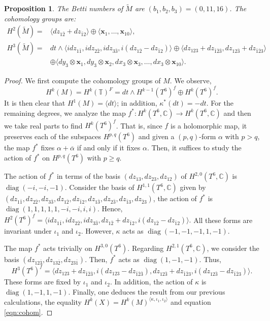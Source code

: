 \documentclass[10pt]{article}
\newcommand{\C}{\mathbb C}
\newcommand{\la}{\langle}
\newcommand{\ra}{\rangle}
\newcommand{\diag}{\operatorname{diag}}
\newcommand{\CC}{\mathbb{C}}
\theoremstyle{plain}
\newtheorem{proposition}{Proposition}
\theoremstyle{definition}
\theoremstyle{remark}
\begin{document}
\begin{proposition} \label{prop:cohomology-M}
The Betti numbers of  $\widetilde{M}$ are $(b_1,b_2,b_3)=(0,11,16)$.
The cohomology groups are:
\begin{align*}
H^2(\widetilde{M})=& \la dz_{1\bar{2}}+ dz_{\bar{1}2} \ra \oplus \la \mathbf{x}_1, \dots, \mathbf{x}_{10} \ra , \\
H^3(\widetilde{M})=&
dt\wedge \la idz_{1\bar{1}},i dz_{2\bar{2}}, i dz_{3\bar{3}}, i(dz_{1\bar{2}}- dz_{\bar{1}2}) \ra \oplus \la dz_{123}+ dz_{\bar{1}\bar{2}\bar{3}},  dz_{12\bar{3}}+ dz_{\bar{1}\bar{2}3} \ra \\
&\oplus \la dy_3 \otimes \mathbf{x}_1, dy_3 \otimes \mathbf{x}_2, dx_3 \otimes \mathbf{x}_3, \dots, dx_3 \otimes \mathbf{x}_{10} \ra.
\end{align*}
\end{proposition}
\begin{proof}
We first compute the cohomology groups of $M$. We observe,
$$
H^k(M)=H^k(\mathbb{T})^{F}=dt\wedge H^{k-1}(T^6)^f \oplus H^k(T^6)^f.
$$
It is then clear that $H^1(M)=\la dt \ra$; in addition, $\kappa^*(dt)=-dt$.
For the remaining degrees, we
analyze the map $f^* \colon H^k(T^6, \CC) \to H^k(T^6, \CC) $ and then we take real parts to find $H^k(T^6)^f$. That is, since $f$ is a holomorphic map, it preserves each of the subspaces $H^{p,q}(T^6)$ and given a $(p,q)$-form $\alpha$ with $p>q$, the map $f^*$ fixes 
$\alpha + \overline{\alpha}$  if and only if it fixes $\alpha$. Then, it suffices to study the action of $f^*$ on $H^{p,q}(T^6)$ with $p\geq q$.

The action of $f^*$ in terms of the basis $(dz_{13}, dz_{23}, dz_{12})$ of $H^{2,0}(T^6,\CC)$ is $\diag(-i,-i,-1)$. Consider the basis of $H^{1,1}(T^6,\C)$ given by $(dz_{1\bar{1}}, dz_{2\bar{2}},dz_{3\bar{3}}, dz_{1\bar{2}}, dz_{\bar{1}2},dz_{1\bar{3}}, dz_{2\bar{3}} ,dz_{\bar{1}3}, dz_{\bar{2}3})$, the action of $f^*$ is $\diag(1,1,1,1,1,-i,-i,i,i)$. Hence, 
$
H^2(T^6)^f=
\la idz_{1\bar{1}},idz_{2\bar{2}},idz_{3\bar{3}}, dz_{1\bar{2}}+ dz_{\bar{1}2}, i(dz_{1\bar{2}}- dz_{\bar{1}2}) \ra.
$
All these forms are invariant under $\iota_1$ and $\iota_2$. However, $\kappa$ acts as $\diag(-1,-1,-1,1,-1)$.

The map $f^*$ acts trivially on $H^{3,0}(T^6)$. Regarding $H^{2,1}(T^6,\CC)$, we consider the basis $(dz_{12\bar{3}},dz_{13\bar{2}}, dz_{23\bar{1}})$. Then, $f^*$ acts as $\diag(1,-1,-1)$. Thus,
 $$
 H^3(T^6)^f=
\la  dz_{123}+ dz_{\bar{1}\bar{2}\bar{3}}, i(dz_{123}- dz_{\bar{1}\bar{2}\bar{3}}),  dz_{12\bar{3}}+ dz_{\bar{1}\bar{2}{3}}, i(dz_{12\bar{3}}- dz_{\bar{1}\bar{2}{3}})\ra.
$$
These forms are fixed by $\iota_1$ and $\iota_2$. In addition, the action of $\kappa$ is $\diag(1,-1,1,-1)$. 
Finally, one deduces the result from our previous calculations, the equality $H^k(X)=H^k(M)^{\la \kappa, \iota_1,\iota_2 \ra}$ and equation \eqref{eqn:cohom}.
\end{proof}
\end{document}
